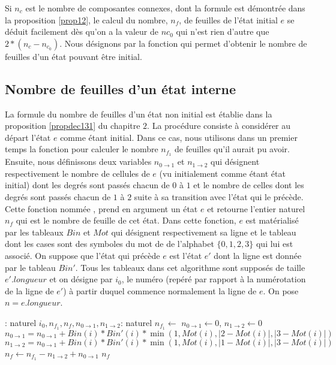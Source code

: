 Si $n_{c}$ est le nombre de composantes connexes, dont la formule est démontrée dans la proposition \ref{prop12}, le calcul du nombre, $n_{f}$, de feuilles de l'état initial $e$  se déduit facilement dès qu'on a la valeur de $nc_{0}$ qui n'est rien d'autre que $2*(n_{c}-n_{c_{0}})$. Nous désignons par  la fonction qui permet d'obtenir le nombre de feuilles d'un état pouvant être initial.
\begin{spacing}{0.30}
\subsection{Nombre de feuilles d'un état interne}
\end{spacing}
La formule du nombre de feuilles  d'un état non initial est établie dans la proposition \ref{propdec131} du chapitre $2$. La procédure consiste à  considérer au départ l'état $e$ comme  étant initial. Dans ce cas, nous utilisons dans un premier temps la fonction  pour calculer le nombre $n_{f_{1}}$ de feuilles qu'il aurait pu  avoir. Ensuite, nous définissons deux variables $n_{0\rightarrow 1}$ et $n_{1\rightarrow 2}$ qui désignent respectivement  le nombre de cellules de $e$ (vu initialement comme étant état initial) dont les degrés sont passés chacun de $0$ à $1$ et le nombre de celles dont les degrés sont passés chacun de $1$ à $2$ suite à sa transition avec l'état qui le précède. Cette fonction  nommée , prend en argument un état $e$ et retourne l'entier naturel $n_{f}$ qui est le nombre de feuille de cet état. Dans cette fonction, $e$ est matérialisé par  les tableaux $Bin$ et $Mot$ qui désignent respectivement sa ligne  et le tableau dont les cases sont des symboles du mot de de l'alphabet $\{0,1,2,3\}$ qui  lui est associé. On suppose que l'état qui précède $e$ est l'état $e'$  dont la ligne est donnée par le tableau $Bin'$. Tous les tableaux dans cet algorithme sont supposés de taille $e'.longueur$ et on désigne par $i_{0}$, le numéro (repéré par rapport à la numérotation de la ligne de $e'$) à partir duquel commence normalement la ligne de $e$. On pose $n=e.longueur$.
\begin{algorithmic}[1]
 : naturel
 \State $i_{0}, n_{f_{1}}, n_{f}, n_{0\rightarrow 1}, n_{1\rightarrow 2}$: naturel
 \State $n_{f_{1}} \leftarrow $ 
 \State $n_{0\rightarrow 1} \leftarrow 0$, $n_{1\rightarrow 2}\leftarrow 0$
      \State $n_{0\rightarrow 1} = n_{0\rightarrow 1} + Bin(i)*Bin'(i)*\min(1,Mot(i), \vert 2-Mot(i)\vert,\vert 3-Mot(i)\vert)$
       \State $n_{1\rightarrow 2} = n_{0\rightarrow 1} + Bin(i)*Bin'(i)*\min(1,Mot(i), \vert 1-Mot(i)\vert,\vert 3-Mot(i)\vert)$
 \EndFor
 \State $n_{f} \leftarrow n_{f_{1}} - n_{1\rightarrow 2}+ n_{0\rightarrow 1} $
  \State \Return $n_{f}$
 \EndFunction
\end{algorithmic}
